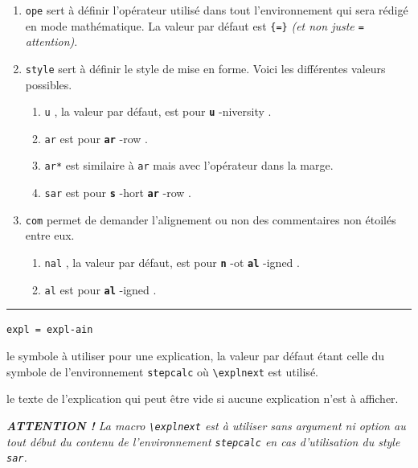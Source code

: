 \documentclass[12pt,a4paper]{article}
\theoremstyle{definition}
\newcommand\env[1]{\texttt{#1}}
\newcommand\macro[1]{\env{\textbackslash{}#1}}
\newcommand\separation{
    \medskip
    \hfill\rule{0.5\textwidth}{0.75pt}\hfill
    \medskip
}
\newcommand\whyprefix[2]{%
    \textbf{\prefix{#1}}-#2%
}
\newcommand\mwhyprefix[2]{%
    \texttt{#1 = #1-#2}%
}
\newcommand\prefix[1]{%
    \texttt{#1}%
}
\begin{document}
\begin{enumerate}
	\item \verb+ope+ sert à définir l'opérateur utilisé dans tout l'environnement qui sera rédigé en mode mathématique. 
	      La valeur par défaut est \verb+{=}+ \emph{(et non juste \texttt{=} attention)}.

	\item \verb+style+ sert à définir le style de mise en forme. Voici les différentes valeurs possibles.
	      \begin{enumerate}
	      		\item \prefix{u}, la valeur par défaut, est pour \whyprefix{u}{niversity}.

	      		\item \prefix{ar} est pour \whyprefix{ar}{row}.

	      		\item \prefix{ar*} est similaire à \prefix{ar}  mais avec l'opérateur dans la marge.

	      		\item \prefix{sar} est pour \whyprefix{s}{hort} \whyprefix{ar}{row}.
	      \end{enumerate}

	\item \verb+com+ permet de demander l'alignement ou non des commentaires non étoilés entre eux.
	      \begin{enumerate}
	      		\item \prefix{nal}, la valeur par défaut, est pour \whyprefix{n}{ot} \whyprefix{al}{igned}.

	      		\item \prefix{al} est pour \whyprefix{al}{igned}.

	      \end{enumerate}
\end{enumerate}


\separation


  \hfill \mwhyprefix{expl}{ain}

\IDoption{} le symbole à utiliser pour une explication, la valeur par défaut étant celle du symbole de l'environnement \env{stepcalc} où \macro{explnext} est utilisé.

\IDarg{} le texte de l'explication qui peut être vide si aucune explication n'est à afficher.

\medskip

\medskip

\emph{\textbf{ATTENTION !} La macro \macro{explnext} est à utiliser sans argument ni option au tout début du contenu de l'environnement \env{stepcalc} en cas d'utilisation du style \texttt{sar}.}
\end{document}

